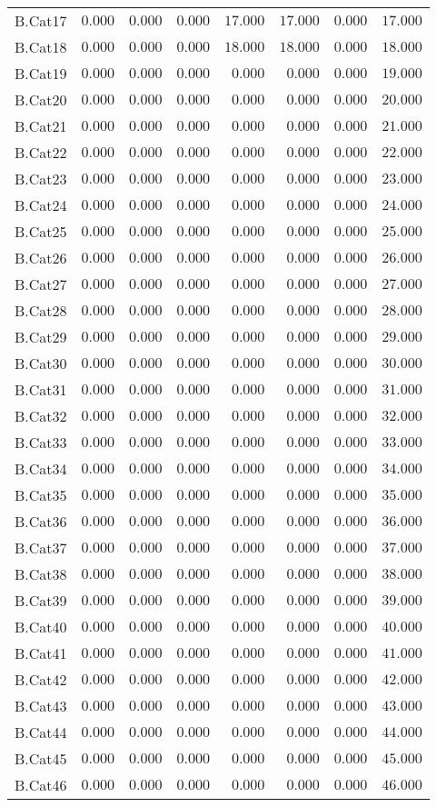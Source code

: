 {\begin{longtable}{lrrrrrrr}
B.Cat17&$ 0.000$&$ 0.000$&$ 0.000$&$ 17.000$&$ 17.000$&$  0.000$&$17.000$\tabularnewline
B.Cat18&$ 0.000$&$ 0.000$&$ 0.000$&$ 18.000$&$ 18.000$&$  0.000$&$18.000$\tabularnewline
B.Cat19&$ 0.000$&$ 0.000$&$ 0.000$&$  0.000$&$  0.000$&$  0.000$&$19.000$\tabularnewline
B.Cat20&$ 0.000$&$ 0.000$&$ 0.000$&$  0.000$&$  0.000$&$  0.000$&$20.000$\tabularnewline
B.Cat21&$ 0.000$&$ 0.000$&$ 0.000$&$  0.000$&$  0.000$&$  0.000$&$21.000$\tabularnewline
B.Cat22&$ 0.000$&$ 0.000$&$ 0.000$&$  0.000$&$  0.000$&$  0.000$&$22.000$\tabularnewline
B.Cat23&$ 0.000$&$ 0.000$&$ 0.000$&$  0.000$&$  0.000$&$  0.000$&$23.000$\tabularnewline
B.Cat24&$ 0.000$&$ 0.000$&$ 0.000$&$  0.000$&$  0.000$&$  0.000$&$24.000$\tabularnewline
B.Cat25&$ 0.000$&$ 0.000$&$ 0.000$&$  0.000$&$  0.000$&$  0.000$&$25.000$\tabularnewline
B.Cat26&$ 0.000$&$ 0.000$&$ 0.000$&$  0.000$&$  0.000$&$  0.000$&$26.000$\tabularnewline
B.Cat27&$ 0.000$&$ 0.000$&$ 0.000$&$  0.000$&$  0.000$&$  0.000$&$27.000$\tabularnewline
B.Cat28&$ 0.000$&$ 0.000$&$ 0.000$&$  0.000$&$  0.000$&$  0.000$&$28.000$\tabularnewline
B.Cat29&$ 0.000$&$ 0.000$&$ 0.000$&$  0.000$&$  0.000$&$  0.000$&$29.000$\tabularnewline
B.Cat30&$ 0.000$&$ 0.000$&$ 0.000$&$  0.000$&$  0.000$&$  0.000$&$30.000$\tabularnewline
B.Cat31&$ 0.000$&$ 0.000$&$ 0.000$&$  0.000$&$  0.000$&$  0.000$&$31.000$\tabularnewline
B.Cat32&$ 0.000$&$ 0.000$&$ 0.000$&$  0.000$&$  0.000$&$  0.000$&$32.000$\tabularnewline
B.Cat33&$ 0.000$&$ 0.000$&$ 0.000$&$  0.000$&$  0.000$&$  0.000$&$33.000$\tabularnewline
B.Cat34&$ 0.000$&$ 0.000$&$ 0.000$&$  0.000$&$  0.000$&$  0.000$&$34.000$\tabularnewline
B.Cat35&$ 0.000$&$ 0.000$&$ 0.000$&$  0.000$&$  0.000$&$  0.000$&$35.000$\tabularnewline
B.Cat36&$ 0.000$&$ 0.000$&$ 0.000$&$  0.000$&$  0.000$&$  0.000$&$36.000$\tabularnewline
B.Cat37&$ 0.000$&$ 0.000$&$ 0.000$&$  0.000$&$  0.000$&$  0.000$&$37.000$\tabularnewline
B.Cat38&$ 0.000$&$ 0.000$&$ 0.000$&$  0.000$&$  0.000$&$  0.000$&$38.000$\tabularnewline
B.Cat39&$ 0.000$&$ 0.000$&$ 0.000$&$  0.000$&$  0.000$&$  0.000$&$39.000$\tabularnewline
B.Cat40&$ 0.000$&$ 0.000$&$ 0.000$&$  0.000$&$  0.000$&$  0.000$&$40.000$\tabularnewline
B.Cat41&$ 0.000$&$ 0.000$&$ 0.000$&$  0.000$&$  0.000$&$  0.000$&$41.000$\tabularnewline
B.Cat42&$ 0.000$&$ 0.000$&$ 0.000$&$  0.000$&$  0.000$&$  0.000$&$42.000$\tabularnewline
B.Cat43&$ 0.000$&$ 0.000$&$ 0.000$&$  0.000$&$  0.000$&$  0.000$&$43.000$\tabularnewline
B.Cat44&$ 0.000$&$ 0.000$&$ 0.000$&$  0.000$&$  0.000$&$  0.000$&$44.000$\tabularnewline
B.Cat45&$ 0.000$&$ 0.000$&$ 0.000$&$  0.000$&$  0.000$&$  0.000$&$45.000$\tabularnewline
B.Cat46&$ 0.000$&$ 0.000$&$ 0.000$&$  0.000$&$  0.000$&$  0.000$&$46.000$\tabularnewline

\end{longtable}}

